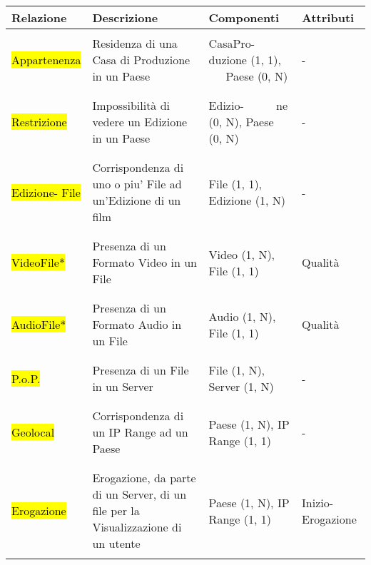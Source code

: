 \documentclass{article}
\begin{document}
%
%
%
%
% 
%
%
%
\begin{tabular}{|C{2cm}|C{4.5cm}|C{2.4cm}|C{2cm}|}
\hline
 \textbf{Relazione}& \textbf{Descrizione}& \textbf{Componenti}& \textbf{Attributi}\\ 
\hline
\hline
& & & \\
 \hl{Appartenenza} & Residenza di una Casa di Produzione in un Paese &  CasaPro- duzione (1, 1), \,\,\,\,\,\,\, Paese (0, N)  & - \\ 
 & & & \\
\hline 
& & & \\
 \hl{Restrizione} & Impossibilità di vedere un Edizione in un Paese & Edizio- \,\,\,\,\,\,\,\,\,\,\,\,\,\,\,ne (0, N), Paese (0, N) & - \\
& & & \\
\hline 
& & & \\
 \hl{Edizione- File} &  Corrispondenza di uno o piu' File ad un'Edizione di un film & File (1, 1), Edizione (1, N)  & - \\
& & & \\
\hline 
& & & \\
 \hl{VideoFile*} & Presenza di un Formato Video in un File & Video (1, N), File (1, 1) & Qualità \\ 
& & & \\
\hline 
& & & \\
 \hl{AudioFile*} & Presenza di un Formato Audio in un File & Audio (1, N), File (1, 1) & Qualità \\ 
& & & \\
\hline
& & & \\
 \hl{P.o.P.} &  Presenza di un File in un Server & File (1, N), Server (1, N) & - \\
 & & & \\
\hline 
& & & \\
 \hl{Geolocal} & Corrispondenza di un IP Range ad un Paese & Paese (1, N), IP Range (1, 1) & - \\ 
& & & \\
\hline 
& & & \\
 \hl{Erogazione} & Erogazione, da parte di un Server, di un file per la Visualizzazione di un utente & Paese (1, N), IP Range (1, 1) & Inizio- Erogazione \\ 
& & & \\
\hline 
\end{tabular}
\end{document}
